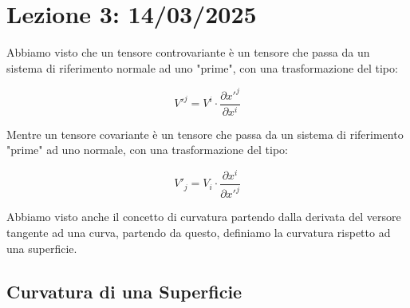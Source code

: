 \newpage

\chapter{Lezione 3: 14/03/2025}

Abbiamo visto che un tensore controvariante è un tensore che passa da un sistema di riferimento normale ad uno "prime", con una trasformazione del tipo:

$$
V'^j = V^i \cdot \dfrac{\partial x'^j}{\partial x^i}
$$

Mentre un tensore covariante è un tensore che passa da un sistema di riferimento "prime" ad uno normale, con una trasformazione del tipo:

$$
V'_j = V_i \cdot \dfrac{\partial x^i}{\partial x'^j}
$$

Abbiamo visto anche il concetto di curvatura partendo dalla derivata del versore tangente ad una curva, partendo da questo, definiamo la curvatura rispetto ad una superficie.

\section{Curvatura di una Superficie}

